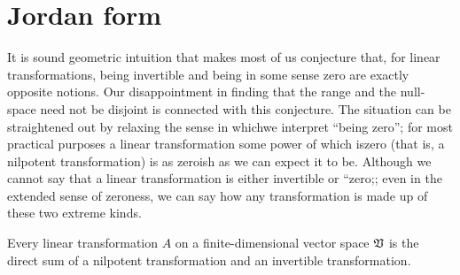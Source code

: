 \section{Jordan form}

It is sound geometric intuition that makes most of us conjecture that, for
linear transformations, being invertible and being in some sense zero are
exactly opposite notions. Our disappointment in finding that the range and the
null-space need not be disjoint is connected with this conjecture. The situation
can be straightened out by relaxing the sense in whichwe interpret ``being
zero''; for most practical purposes a linear transformation some power of which
iszero (that is, a nilpotent transformation) is as zeroish as we can expect it
to be. Although we cannot say that a linear transformation is either invertible
or ``zero;; even in the extended sense of zeroness, we can say how any
transformation is made up of these two extreme kinds.

\begin{theorem}
    Every linear transformation \(A\) on a finite-dimensional vector space \(\mathfrak{V}\) is the direct sum of a nilpotent transformation and an invertible transformation.
\end{theorem}

